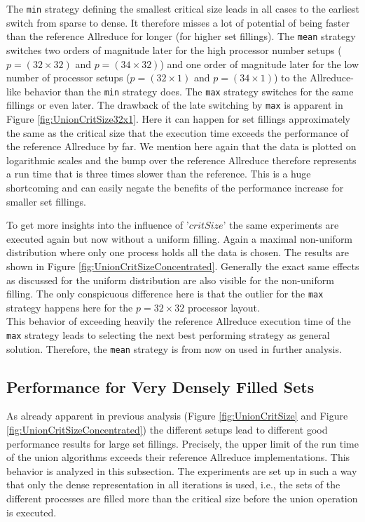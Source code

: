 The \texttt{min} strategy defining the smallest critical size leads in all cases to the earliest switch from sparse to dense. It therefore misses a lot of potential of being faster than the reference Allreduce for longer (for higher set fillings). 
The \texttt{mean} strategy switches two orders of magnitude later for the high processor number setups ($p=(32\times32)$ and $p=(34\times32)$) and one order of magnitude later for the low number of processor setups ($p=(32\times1)$ and $p=(34\times1)$) to the Allreduce-like behavior than the \texttt{min} strategy does. The \texttt{max} strategy switches for the same fillings or even later. The drawback of the late switching by \texttt{max} is apparent in Figure \ref{fig:UnionCritSize32x1}. 
Here it can happen for set fillings approximately the same as the critical size that the execution time exceeds the performance of the reference Allreduce by far. We mention here again that the data is plotted on logarithmic scales and the bump over the reference Allreduce therefore represents a run time that is three times slower than the reference. This is a huge shortcoming and can easily negate the benefits of the performance increase for smaller set fillings.

To get more insights into the influence of '$critSize$' the same experiments are executed again but now without a uniform filling. Again a maximal non-uniform distribution where only one process holds all the data is chosen. The results are shown in Figure \ref{fig:UnionCritSizeConcentrated}.
Generally the exact same effects as discussed for the uniform distribution are also visible for the non-uniform filling. The only conspicuous  difference here is that the outlier for the \texttt{max} strategy happens here for the $p=32\times32$ processor layout.\\
This behavior of exceeding heavily the reference Allreduce execution time of the \texttt{max} strategy leads to selecting the next best performing strategy as general solution. Therefore, the \texttt{mean} strategy is from now on used in further analysis.

\subsection{Performance for Very Densely Filled Sets}
As already apparent in previous analysis (Figure \ref{fig:UnionCritSize} and Figure \ref{fig:UnionCritSizeConcentrated}) the different setups lead to different good performance results for large set fillings. Precisely, the upper limit of the run time of the union algorithms exceeds their reference Allreduce implementations. This behavior is analyzed in this subsection. The experiments are set up in such a way that only the dense representation in all iterations is used, i.e., the sets of the different processes are filled more than the critical size before the union operation is executed.\\
